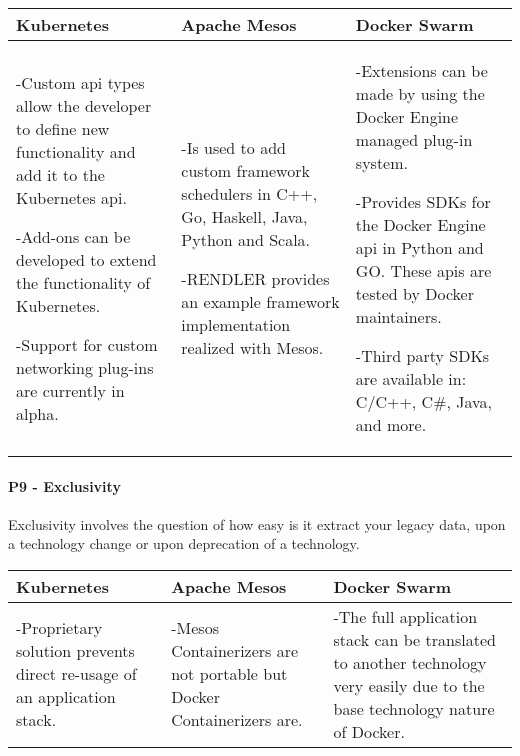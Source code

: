\begin{center}
  \begin{tabular}{ | p{4.5cm} | p{4.5cm} | p{4.5cm} | }
    \hline
    \textbf{Kubernetes}&\textbf{Apache Mesos}&\textbf{Docker Swarm}\\\hline
    -Custom \gls{api} types allow the developer to define new functionality and add it
    to the Kubernetes \gls{api}.
    
    -Add-ons can be developed to extend the functionality of Kubernetes.
    
    -Support for custom networking plug-ins are currently in alpha.& 
    
    -Is used to add custom framework schedulers in C++, Go, Haskell, Java,
    Python and Scala.
    
    -RENDLER provides an example framework implementation realized with Mesos.& 
    
    -Extensions can be made by using the Docker Engine managed plug-in system.
    
    -Provides SDKs for the Docker Engine \gls{api} in Python and GO. These
    \glspl{api} are tested by Docker maintainers.
    
    -Third party SDKs are available in: C/C++, C\#, Java, and more.\\
    \hline
  \end{tabular}
\end{center}

\paragraph{P9 - Exclusivity}

Exclusivity involves the question of how easy is it extract your legacy data,
upon a technology change or upon deprecation of a technology.

\begin{center}
  \begin{tabular}{ | p{4.5cm} | p{4.5cm} | p{4.5cm} | }
    \hline
    \textbf{Kubernetes}&\textbf{Apache Mesos}&\textbf{Docker Swarm}\\\hline
    -Proprietary solution prevents direct re-usage of an application stack. & 
    
    -Mesos Containerizers are not portable but Docker Containerizers are. &
    
    -The full application stack can be translated to another technology very
    easily due to the base technology nature of Docker.\\
    \hline
  \end{tabular}
\end{center}

